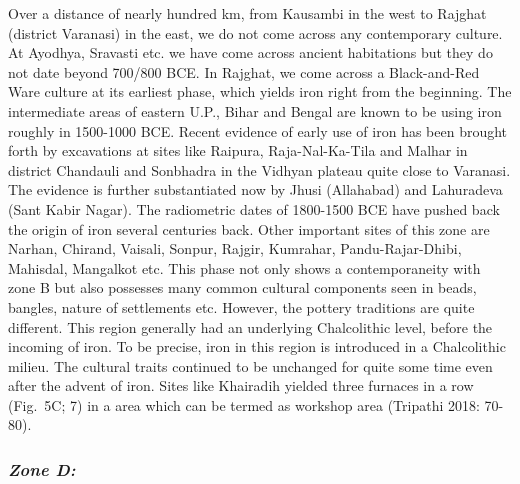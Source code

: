 Over a distance of nearly hundred km, from Kausambi in the west to Rajghat (district Varanasi) in the east, we do not come across any contemporary culture. At Ayodhya, Sravasti etc. we have come across ancient habitations but they do not date beyond 700/800 BCE. In Rajghat, we come across a Black-and-Red Ware culture at its earliest phase, which yields iron right from the beginning. The intermediate areas of eastern U.P., Bihar and Bengal are known to be using iron roughly in 1500-1000 BCE. Recent evidence of early use of iron has been brought forth by excavations at sites like Raipura, Raja-Nal-Ka-Tila and Malhar in district Chandauli and Sonbhadra in the Vidhyan plateau quite close to Varanasi. The evidence is further substantiated now by Jhusi (Allahabad) and Lahuradeva (Sant Kabir Nagar). The radiometric dates of 1800-1500 BCE have pushed back the origin of iron several centuries back. Other important sites of this zone are Narhan, Chirand, Vaisali, Sonpur, Rajgir, Kumrahar, Pandu-Rajar-Dhibi, Mahisdal, Mangalkot etc. This phase not only shows a contemporaneity with zone B but also possesses many common cultural components seen in beads, bangles, nature of settlements etc. However, the pottery traditions are quite different. This region generally had an underlying Chalcolithic level, before the incoming of iron. To be precise, iron in this region is introduced in a Chalcolithic milieu. The cultural traits continued to be unchanged for quite some time even after the advent of iron. Sites like Khairadih yielded three furnaces in a row (Fig.~5C; 7) in a area which can be termed as workshop area (Tripathi 2018: 70-80).

\vspace{-.3cm}

\subsubsection*{\textit{Zone D:}}

\vspace{-.2cm}

